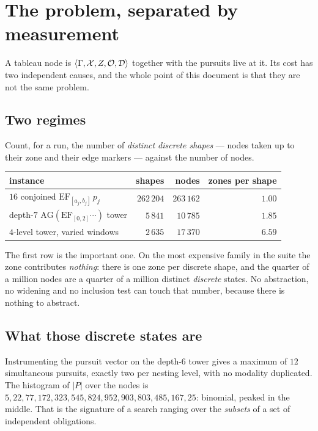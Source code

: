 \section{The problem, separated by measurement}
\label{sec:problem}

A tableau node is $\langle \Gamma, \mathcal{X}, Z, \mathcal{O}, \mathcal{D}\rangle$ together
with the pursuits live at it. Its cost has two independent causes, and the
whole point of this document is that they are not the same problem.

\subsection{Two regimes}

Count, for a run, the number of \emph{distinct discrete shapes} --- nodes taken
up to their zone and their edge markers --- against the number of nodes.

\begin{center}\small
\begin{tabular}{@{}lrrr@{}}
\toprule
instance & shapes & nodes & zones per shape \\
\midrule
$16$ conjoined $\mathrm{EF}_{[a_j,b_j]}\,p_j$ & $262\,204$ & $263\,162$ & $\mathbf{1.00}$ \\
depth-$7$ $\mathrm{AG}(\mathrm{EF}_{[0,2]}\cdots)$ tower & $5\,841$ & $10\,785$ & $1.85$ \\
$4$-level tower, varied windows & $2\,635$ & $17\,370$ & $6.59$ \\
\bottomrule
\end{tabular}
\end{center}

The first row is the important one. On the most expensive family in the suite
the zone contributes \emph{nothing}: there is one zone per discrete shape, and
the quarter of a million nodes are a quarter of a million distinct
\emph{discrete} states. No abstraction, no widening and no inclusion test can
touch that number, because there is nothing to abstract.

\subsection{What those discrete states are}

Instrumenting the pursuit vector on the depth-$6$ tower gives a maximum of
$12$ simultaneous pursuits, exactly two per nesting level, with no modality
duplicated. The histogram of $|P|$ over the nodes is
$5, 22, 77, 172, 323, 545, 824, 952, 903, 803, 485, 167, 25$: binomial, peaked
in the middle. That is the signature of a search ranging over the
\emph{subsets} of a set of independent obligations.

